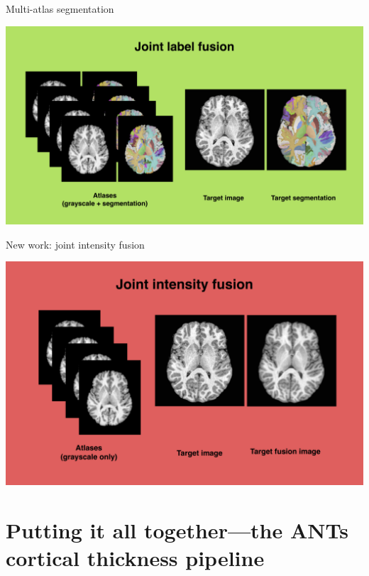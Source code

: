 \documentclass[ignorenonframetext,]{beamer}
\begin{document}
\begin{frame}{Multi-atlas segmentation}

\includegraphics{./tools/jointfusion/figures/jointLabelFusion.png}

\end{frame}

\begin{frame}{New work: joint intensity fusion}

\includegraphics{./tools/jointfusion/figures/jointIntensityFusion.png}

\end{frame}

\section{Putting it all together---the ANTs cortical thickness
pipeline}\label{putting-it-all-togetherthe-ants-cortical-thickness-pipeline}
\end{document}

